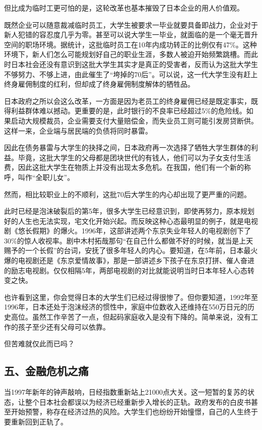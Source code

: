 但比成为临时工更可怕的是，这轮改革也基本摧毁了日本企业的用人价值观。

既然企业可以随意裁减临时员工，大学生被要求一毕业就要具备即战力，企业对于新人犯错的容忍度几乎为零。甚至可以说大学生一毕业，就面临的是一个毫无晋升空间的职场环境。据统计，这批临时员工在10年内成功转正的比例仅有47\%。这种环境下，新人们怎么可能规划好自己的职业生涯，多数人被迫开始频繁跳槽。而此时日本社会还没有意识到这批大学生其实才是真正的受害者，反而认为这批大学生不够努力、不够上进，由此催生了“垮掉的70后”。可以说，这一代大学生没有赶上终身雇佣制度的红利，但却成了终身雇佣制度解体的牺牲品。

日本政府之所以会这么改革，一方面是因为老员工的终身雇佣已经是既定事实，既得利益群体难以撼动。更重要的是，此时银行的不良率已经超过5\%的危险线。如果启动大规模裁员，企业需要支付大量赔偿金，而失业员工则可能引发房贷断供。这样一来，企业端与居民端的负债将同时暴雷。

因此在债务暴雷与大学生的抉择之间，日本政府再一次选择了牺牲大学生群体的利益。毕竟，这批大学生的父母都是团块世代的有钱人，他们可以为子女支付生活费，因此这批大学生在物质上并没有出现太多危机。在我国，他们有一个新的称呼，叫作“全职儿女”。

然而，相比较职业上的不顺利，这批70后大学生的内心却出现了更严重的问题。

此时已经是泡沫破裂后的第5年，很多大学生已经意识到，即使再努力，原本规划好的人生也无法实现，宅文化开始兴起。而反映这种心态最明显的例子，就是电视剧《悠长假期》的爆火。1996年，这部讲述两个东京失业年轻人的电视剧创下了30\%的惊人收视率。剧中木村拓哉那句“在自己什么都做不好的时候，就当是上天赐予的一个长假”的台词，安抚了很多年轻人的内心。要知道，在5年前，日本最火爆的电视剧还是《东京爱情故事》，那是一部讲述乡下孩子在东京打拼、催人奋进的励志电视剧。仅仅相隔5年，两部电视剧的对比就能说明当时日本年轻人心态转变之快。

也许看到这里，你会觉得日本的大学生们已经过得很惨了。但你要知道，1992年至1996年，日本还处于泡沫经济的惯性中，家庭中位数收入还维持在550万日元的历史高位。虽然工作辛苦了一点，但起码家庭收入是没有下降的。简单来说，没有工作的孩子至少还有父母可以依靠。

但苦难就仅此而已吗？

\subsection{五、金融危机之痛}

当1997年新年的钟声敲响，日经指数重新站上21000点大关。这一短暂的复苏的状态，让整个日本社会都误以为经济已经重新步入增长的正轨。政府发布的白皮书甚至开始预警，称存在经济过热的风险。大学生们也纷纷开始憧憬，自己的人生终于要重新回到正轨了。

